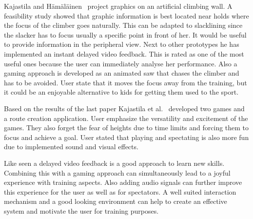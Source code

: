 Kajastila and Hämäläinen~\cite{Kajastila2014-ug} project graphics on an artificial climbing wall. A feasibility study showed that graphic information is best located near holds where the focus of the climber goes naturally. 
This can be adapted to slacklining since the slacker has to focus usually a specific point in front of her. It would be useful to provide information in the peripheral view. Next to other prototypes he has implemented an instant delayed video feedback. This is rated as one of the most useful ones because the user can immediately analyse her performance. Also a gaming approach is developed as an animated saw that chases the climber and has to be avoided. User state that it moves the focus away from the training, but it could be an enjoyable alternative to kids for getting them used to the sport. 

Based on the results of the last paper Kajastila et al.~\cite{Kajastila2016-ot} developed two games and a route creation application. User emphasize the versatility and excitement of the games. They also forget the fear of heights due to time limits and forcing them to focus and achieve a goal. User stated that playing and spectating is also more fun due to implemented sound and visual effects.

Like seen a delayed video feedback is a good approach to learn new skills. Combining this with a gaming approach can simultaneously lead to a joyful experience with training aspects. Also adding audio signals can further improve this experience for the user as well as for spectators. A well suited interaction mechanism and a good looking environment can help to create an effective system and motivate the user for training purposes.

